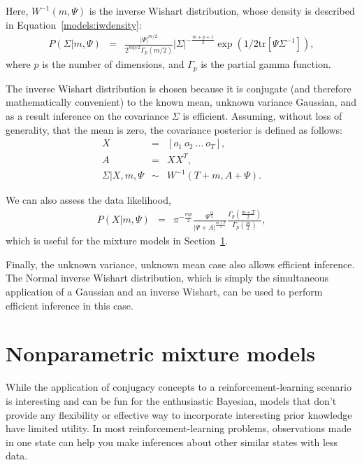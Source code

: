 Here, $W^{-1}(m, \Psi)$ is the inverse Wishart distribution, whose density is described in Equation~\ref{models:iwdensity}:
\begin{eqnarray}
\label{models:iwdensity}P(\Sigma|m,\Psi)&=&\frac{|\Psi|^{m/2}}{2^{mp/2}\Gamma_p(m/2)}|\Sigma|^{-\frac{m+p+1}{2}}\exp\left(1/2 \mbox{tr}\left[\Psi\Sigma^{-1}\right]\right),
\end{eqnarray}
where $p$ is the number of dimensions, and $\Gamma_p$ is the partial gamma function.

The inverse Wishart distribution is chosen because it is conjugate (and therefore mathematically convenient) to the known mean, unknown variance Gaussian, and as a result inference on the covariance $\Sigma$ is efficient. Assuming, without loss of generality, that the mean is zero, the covariance posterior is defined as follows:
\begin{eqnarray}
X &=& \left[o_1 \ o_2 \ ... \ o_T\right],\\
A &=& X X^T,\\
\Sigma|X, m, \Psi &\sim& W^{-1}(T+m, A+\Psi).
\end{eqnarray}


We can also assess the data likelihood,
\begin{eqnarray}
P(X|m, \Psi) &=& \pi^{-\frac{mp}{2}} 
\frac {\Psi^\frac{m}{2}}
      {|\Psi+A|^\frac{m+T}{2}} 
\frac {\Gamma_p(\frac{m+T}{2})} 
      {\Gamma_p(\frac{m}{2})},
\end{eqnarray}
which is useful for the mixture models in Section~\ref{models:npm}.

Finally, the unknown variance, unknown mean case also allows efficient inference. The Normal inverse Wishart distribution, which is simply the simultaneous application of a Gaussian and an inverse Wishart, can be used to perform efficient inference in this case.

\section{Nonparametric mixture models}
\label{models:npm}

While the application of conjugacy concepts to a reinforcement-learning scenario is interesting and can be fun for the enthusiastic Bayesian, models that don't provide any flexibility or effective way to incorporate interesting prior knowledge have limited utility. In most reinforcement-learning problems, observations made in one state can help you make inferences about other similar states with less data.


